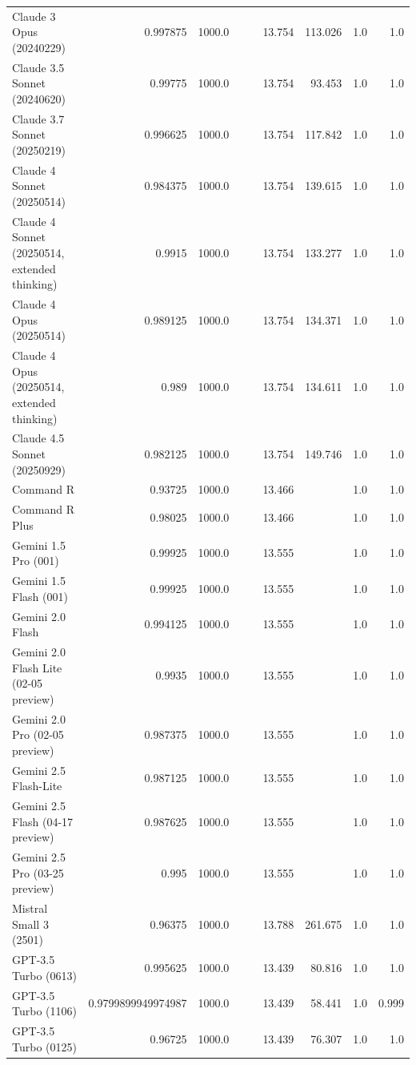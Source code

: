 \begin{table}[htp]
{\begin{tabular}{lrrrrrrrr}
Claude 3 Opus (20240229) & 0.997875 & 1000.0 &  &  & 13.754 & 113.026 & 1.0 & 1.0 \\
Claude 3.5 Sonnet (20240620) & 0.99775 & 1000.0 &  &  & 13.754 & 93.453 & 1.0 & 1.0 \\
Claude 3.7 Sonnet (20250219) & 0.996625 & 1000.0 &  &  & 13.754 & 117.842 & 1.0 & 1.0 \\
Claude 4 Sonnet (20250514) & 0.984375 & 1000.0 &  &  & 13.754 & 139.615 & 1.0 & 1.0 \\
Claude 4 Sonnet (20250514, extended thinking) & 0.9915 & 1000.0 &  &  & 13.754 & 133.277 & 1.0 & 1.0 \\
Claude 4 Opus (20250514) & 0.989125 & 1000.0 &  &  & 13.754 & 134.371 & 1.0 & 1.0 \\
Claude 4 Opus (20250514, extended thinking) & 0.989 & 1000.0 &  &  & 13.754 & 134.611 & 1.0 & 1.0 \\
Claude 4.5 Sonnet (20250929) & 0.982125 & 1000.0 &  &  & 13.754 & 149.746 & 1.0 & 1.0 \\
Command R & 0.93725 & 1000.0 &  &  & 13.466 &  & 1.0 & 1.0 \\
Command R Plus & 0.98025 & 1000.0 &  &  & 13.466 &  & 1.0 & 1.0 \\
Gemini 1.5 Pro (001) & 0.99925 & 1000.0 &  &  & 13.555 &  & 1.0 & 1.0 \\
Gemini 1.5 Flash (001) & 0.99925 & 1000.0 &  &  & 13.555 &  & 1.0 & 1.0 \\
Gemini 2.0 Flash & 0.994125 & 1000.0 &  &  & 13.555 &  & 1.0 & 1.0 \\
Gemini 2.0 Flash Lite (02-05 preview) & 0.9935 & 1000.0 &  &  & 13.555 &  & 1.0 & 1.0 \\
Gemini 2.0 Pro (02-05 preview) & 0.987375 & 1000.0 &  &  & 13.555 &  & 1.0 & 1.0 \\
Gemini 2.5 Flash-Lite & 0.987125 & 1000.0 &  &  & 13.555 &  & 1.0 & 1.0 \\
Gemini 2.5 Flash (04-17 preview) & 0.987625 & 1000.0 &  &  & 13.555 &  & 1.0 & 1.0 \\
Gemini 2.5 Pro (03-25 preview) & 0.995 & 1000.0 &  &  & 13.555 &  & 1.0 & 1.0 \\
Mistral Small 3 (2501) & 0.96375 & 1000.0 &  &  & 13.788 & 261.675 & 1.0 & 1.0 \\
GPT-3.5 Turbo (0613) & 0.995625 & 1000.0 &  &  & 13.439 & 80.816 & 1.0 & 1.0 \\
GPT-3.5 Turbo (1106) & 0.9799899949974987 & 1000.0 &  &  & 13.439 & 58.441 & 1.0 & 0.999 \\
GPT-3.5 Turbo (0125) & 0.96725 & 1000.0 &  &  & 13.439 & 76.307 & 1.0 & 1.0 \\

\end{tabular}}
\end{table}
